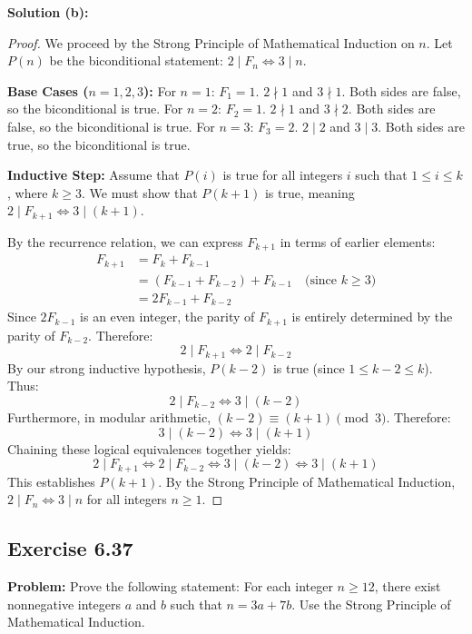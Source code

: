 \documentclass[11pt, a4paper]{article}
\theoremstyle{definition}
\theoremstyle{remark}
\begin{document}
\textbf{Solution (b):}
\begin{proof}
    We proceed by the Strong Principle of Mathematical Induction on $n$. Let $P(n)$ be the biconditional statement: $2 \mid F_n \iff 3 \mid n$.
    
    \textbf{Base Cases ($n=1, 2, 3$):}
    For $n=1$: $F_1 = 1$. $2 \nmid 1$ and $3 \nmid 1$. Both sides are false, so the biconditional is true.
    For $n=2$: $F_2 = 1$. $2 \nmid 1$ and $3 \nmid 2$. Both sides are false, so the biconditional is true.
    For $n=3$: $F_3 = 2$. $2 \mid 2$ and $3 \mid 3$. Both sides are true, so the biconditional is true.
    
    \textbf{Inductive Step:}
    Assume that $P(i)$ is true for all integers $i$ such that $1 \le i \le k$, where $k \ge 3$. We must show that $P(k+1)$ is true, meaning $2 \mid F_{k+1} \iff 3 \mid (k+1)$.
    
    By the recurrence relation, we can express $F_{k+1}$ in terms of earlier elements:
    \begin{align*}
        F_{k+1} &= F_k + F_{k-1} \\
        &= (F_{k-1} + F_{k-2}) + F_{k-1} \quad \text{(since $k \ge 3$)} \\
        &= 2F_{k-1} + F_{k-2}
    \end{align*}
    Since $2F_{k-1}$ is an even integer, the parity of $F_{k+1}$ is entirely determined by the parity of $F_{k-2}$. Therefore:
    \[ 2 \mid F_{k+1} \iff 2 \mid F_{k-2} \]
    By our strong inductive hypothesis, $P(k-2)$ is true (since $1 \le k-2 \le k$). Thus:
    \[ 2 \mid F_{k-2} \iff 3 \mid (k-2) \]
    Furthermore, in modular arithmetic, $(k-2) \equiv (k+1) \pmod 3$. Therefore:
    \[ 3 \mid (k-2) \iff 3 \mid (k+1) \]
    Chaining these logical equivalences together yields:
    \[ 2 \mid F_{k+1} \iff 2 \mid F_{k-2} \iff 3 \mid (k-2) \iff 3 \mid (k+1) \]
    This establishes $P(k+1)$. By the Strong Principle of Mathematical Induction, $2 \mid F_n \iff 3 \mid n$ for all integers $n \ge 1$.
\end{proof}

\subsection{Exercise 6.37}
\textbf{Problem:} Prove the following statement: For each integer $n \ge 12$, there exist nonnegative integers $a$ and $b$ such that $n = 3a + 7b$. Use the Strong Principle of Mathematical Induction.
\end{document}
